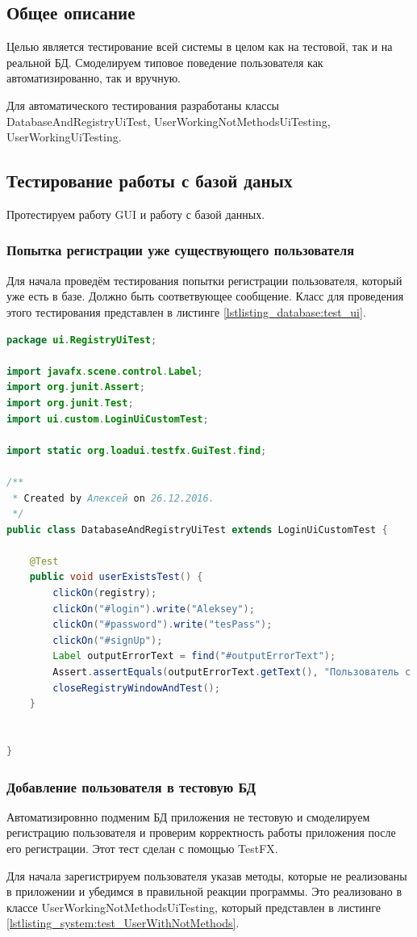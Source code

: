 \documentclass[a4paper,12pt]{article}
\begin{document}
\subsection{Общее описание}
Целью является тестирование всей системы в целом как на тестовой, так и на реальной БД.
Смоделируем типовое поведение пользователя как автоматизированно, так и вручную.

Для автоматического тестирования разработаны классы DatabaseAndRegistryUiTest, UserWorkingNotMethodsUiTesting, UserWorkingUiTesting.

\newpage \subsection{Тестирование работы с базой даных}
Протестируем работу GUI и работу с базой данных.  

\subsubsection{Попытка регистрации уже существующего пользователя}
Для начала проведём тестирования попытки регистрации пользователя, который уже есть в базе. Должно быть соответвующее сообщение. Класс для проведения этого тестирования представлен в листинге \ref{lstlisting_database:test_ui}.

\begin{lstlisting}[language=java, caption=код модуля DatabaseAndRegistryUiTest.java, label=lstlisting_database:test_ui]
package ui.RegistryUiTest;

import javafx.scene.control.Label;
import org.junit.Assert;
import org.junit.Test;
import ui.custom.LoginUiCustomTest;

import static org.loadui.testfx.GuiTest.find;

/**
 * Created by Алексей on 26.12.2016.
 */
public class DatabaseAndRegistryUiTest extends LoginUiCustomTest {

    @Test
    public void userExistsTest() {
        clickOn(registry);
        clickOn("#login").write("Aleksey");
        clickOn("#password").write("tesPass");
        clickOn("#signUp");
        Label outputErrorText = find("#outputErrorText");
        Assert.assertEquals(outputErrorText.getText(), "Пользователь с логином: Aleksey существует!");
        closeRegistryWindowAndTest();
    }


}
\end{lstlisting}

\subsubsection{Добавление пользователя в тестовую БД}
Автоматизировнно подменим БД приложения не тестовую и смоделируем регистрацию пользователя и проверим корректность работы приложения после его регистрации. Этот тест сделан с помощью TestFX. 
\par Для начала зарегистрируем пользователя указав методы, которые не реализованы в приложении и убедимся в правильной реакции программы. Это реализовано в классе UserWorkingNotMethodsUiTesting, который представлен в листинге \ref{lstlisting_system:test_UserWithNotMethods}.
\end{document}
